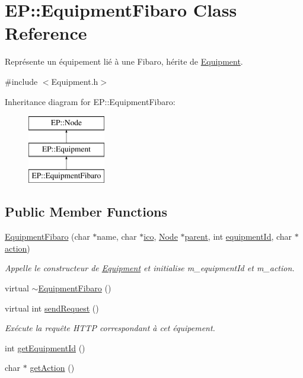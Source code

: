 \hypertarget{class_e_p_1_1_equipment_fibaro}{}\section{EP\+:\+:Equipment\+Fibaro Class Reference}
\label{class_e_p_1_1_equipment_fibaro}


Représente un équipement lié à une Fibaro, hérite de \hyperlink{class_e_p_1_1_equipment}{Equipment}.  




{\ttfamily \#include $<$Equipment.\+h$>$}

Inheritance diagram for EP\+:\+:Equipment\+Fibaro\+:\begin{figure}[H]
\begin{center}
\leavevmode
\includegraphics[height=3.000000cm]{class_e_p_1_1_equipment_fibaro}
\end{center}
\end{figure}
\subsection*{Public Member Functions}
\begin{DoxyCompactItemize}
\item 
\hyperlink{class_e_p_1_1_equipment_fibaro_a1aceacf1010faf9042e2a5a4c2f79ae8}{Equipment\+Fibaro} (char $\ast$name, char $\ast$\hyperlink{namespace_e_p_a9bb18717237cbb94269e26c77cc04b05}{ico}, \hyperlink{class_e_p_1_1_node}{Node} $\ast$\hyperlink{namespace_e_p_ae54856cdea91964313d781ec414f88fc}{parent}, int \hyperlink{namespace_e_p_a720661c6f3b93cc86d108b686beac651}{equipment\+Id}, char $\ast$\hyperlink{namespace_e_p_a3f543204ed06fa87d908e9f15faf0c2a}{action})
\begin{DoxyCompactList}\small\item\em Appelle le constructeur de \hyperlink{class_e_p_1_1_equipment}{Equipment} et initialise m\+\_\+equipment\+Id et m\+\_\+action. \end{DoxyCompactList}\item 
virtual \hyperlink{class_e_p_1_1_equipment_fibaro_a099ab7245c3ad2e12492f9980d03cf89}{$\sim$\+Equipment\+Fibaro} ()
\item 
virtual int \hyperlink{class_e_p_1_1_equipment_fibaro_aff3a8468127e7915e1757d8b9b600587}{send\+Request} ()
\begin{DoxyCompactList}\small\item\em Exécute la requête H\+T\+TP correspondant à cet équipement. \end{DoxyCompactList}\item 
int \hyperlink{class_e_p_1_1_equipment_fibaro_abdd7cbd67d1f3a06dd57fa9dc3b33a59}{get\+Equipment\+Id} ()
\item 
char $\ast$ \hyperlink{class_e_p_1_1_equipment_fibaro_ad411fa6e04286c4b0eabf258226c95f3}{get\+Action} ()
\end{DoxyCompactItemize}
